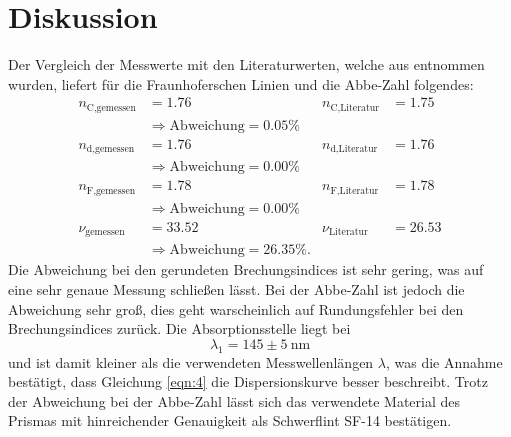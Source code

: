 \section{Diskussion}
\label{sec:Diskussion}
Der Vergleich der Messwerte mit den Literaturwerten, welche aus \cite{3} entnommen wurden, liefert für die Fraunhoferschen Linien und die Abbe-Zahl folgendes:
\begin{align*}
  n_\text{C,gemessen} &= 1.76 &   n_\text{C,Literatur} &= 1.75 \\
  & \Rightarrow \text{Abweichung} = 0.05 \% \\
  n_\text{d,gemessen} &= 1.76 &   n_\text{d,Literatur} &= 1.76 \\
  & \Rightarrow \text{Abweichung} = 0.00 \% \\
  n_\text{F,gemessen} &= 1.78 &   n_\text{F,Literatur} &= 1.78 \\
  & \Rightarrow \text{Abweichung} = 0.00 \% \\
  {\nu}_\text{gemessen} &= 33.52 &   {\nu}_\text{Literatur} &= 26.53 \\
  & \Rightarrow \text{Abweichung} = 26.35 \% .
\end{align*}
Die Abweichung bei den gerundeten Brechungsindices ist sehr gering, was auf eine sehr genaue Messung schließen lässt.
Bei der Abbe-Zahl ist jedoch die Abweichung sehr groß, dies geht warscheinlich auf Rundungsfehler bei den Brechungsindices zurück.
Die Absorptionsstelle liegt bei
\begin{equation*}
      {\lambda}_1 = 145 \pm 5 \: \si{\nano\metre}
\end{equation*}
und ist damit kleiner als die verwendeten Messwellenlängen $ \lambda $, was die Annahme bestätigt, dass Gleichung \ref{eqn:4} die Dispersionskurve besser beschreibt.
Trotz der Abweichung bei der Abbe-Zahl lässt sich das verwendete Material des Prismas mit hinreichender Genauigkeit als Schwerflint SF-14 bestätigen.
